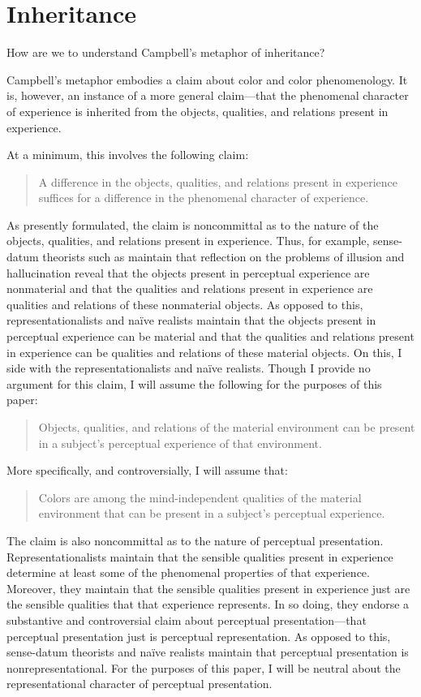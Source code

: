 \documentclass[12pt]{article}
\begin{document}
\section{Inheritance}\label{sec:inheritance} 

How are we to understand Campbell's metaphor of inheritance? 

Campbell's metaphor embodies a claim about color and color phenomenology. It is, however, an instance of a more general claim---that the phenomenal character of experience is inherited from the objects, qualities, and relations present in experience. 

At a minimum, this involves the following claim: 
\begin{quote}
	A difference in the objects, qualities, and relations present in experience suffices for a difference in the phenomenal character of experience. 
\end{quote}

As presently formulated, the claim is noncommittal as to the nature of the objects, qualities, and relations present in experience. Thus, for example, sense-datum theorists such as \citet{Price:1932fk} maintain that reflection on the problems of illusion and hallucination reveal that the objects present in perceptual experience are nonmaterial and that the qualities and relations present in experience are qualities and relations of these nonmaterial objects. As opposed to this, representationalists and na\"ive realists maintain that the objects present in perceptual experience can be material and that the qualities and relations present in experience can be qualities and relations of these material objects. On this, I side with the representationalists and na\"ive realists. Though I provide no argument for this claim, I will assume the following for the purposes of this paper: 
\begin{quote}
	Objects, qualities, and relations of the material environment can be present in a subject's perceptual experience of that environment. 
\end{quote}
More specifically, and controversially, I will assume that: 
\begin{quote}
	Colors are among the mind-independent qualities of the material environment that can be present in a subject's perceptual experience. 
\end{quote}

The claim is also noncommittal as to the nature of perceptual presentation. Representationalists maintain that the sensible qualities present in experience determine at least some of the phenomenal properties of that experience. Moreover, they maintain that the sensible qualities present in experience just are the sensible qualities that that experience represents. In so doing, they endorse a substantive and controversial claim about perceptual presentation---that perceptual presentation just is perceptual representation. As opposed to this, sense-datum theorists and na\"ive realists maintain that perceptual presentation is nonrepresentational. For the purposes of this paper, I will be neutral about the representational character of perceptual presentation.
\end{document}
